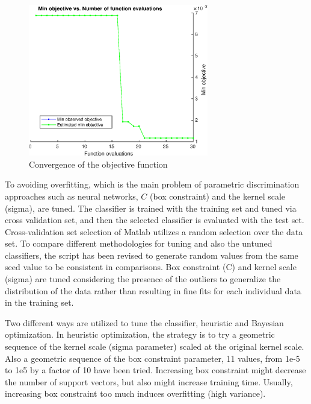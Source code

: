 \begin{figure}
\begin{center}
\includegraphics[width=0.7\textwidth]{figures/objectiveFuncEval}    %
\caption{Convergence of the objective function} 
\label{fig:objectiveFuncEval}
\end{center}
\end{figure}

To avoiding overfitting, which is the main problem of parametric discrimination approaches such as neural networks, $C$ (box constraint) and the kernel scale (sigma), are tuned.
The classifier is trained with the training set and tuned via cross validation set, and then the selected classifier is evaluated with the test set. Cross-validation set selection of Matlab utilizes a random selection over the data set. 
To compare different methodologies for tuning and also the untuned classifiers, the script has been revised to generate random values from the same seed value to be consistent in comparisons.
Box constraint (C) and kernel scale (sigma) are tuned considering the presence of the outliers to generalize the distribution of the data rather than resulting in fine fits for each individual data in the training set. 

Two different ways are utilized to tune the classifier, heuristic and Bayesian optimization. In heuristic optimization, the strategy is to try a geometric sequence of the kernel scale (sigma parameter) scaled at the original kernel scale.  
Also a geometric sequence of the box constraint parameter, 11 values, from 1e-5 to 1e5 by a factor of 10 have been tried. Increasing box constraint might decrease the number of support vectors, but also might increase training time. 
Usually, increasing box constraint too much induces overfitting (high variance). 

